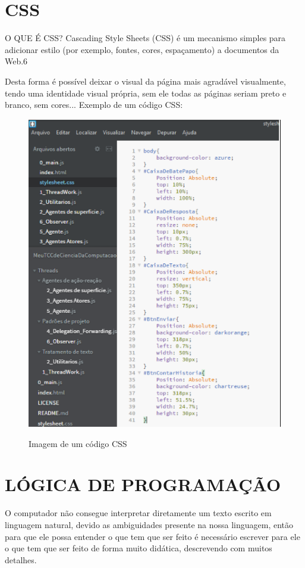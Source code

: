 \section{CSS}
\label{sec:CSS}

O QUE É CSS? Cascading Style Sheets (CSS) é um mecanismo simples para adicionar estilo (por exemplo, fontes, cores, espaçamento) a documentos da Web.6 

Desta forma é possível deixar o visual da página mais agradável visualmente, tendo uma identidade visual própria, sem ele todas as páginas seriam preto e branco, sem cores... 
Exemplo de um código CSS: 

\begin{figure}[H]
	\centering
	\caption{Imagem de um código CSS}
	\centering
	\includegraphics{./images/Figure_6}	
	\label{fig:Fig6} 
\end{figure}

\section{LÓGICA DE PROGRAMAÇÃO }
\label{sec:LÓGICA DE PROGRAMAÇÃO}

O computador não consegue interpretar diretamente um texto escrito em linguagem natural, devido as ambiguidades presente na nossa linguagem, então para que ele possa entender o que tem que ser feito é necessário escrever para ele o que tem que ser feito de forma muito didática, descrevendo com muitos detalhes.   

